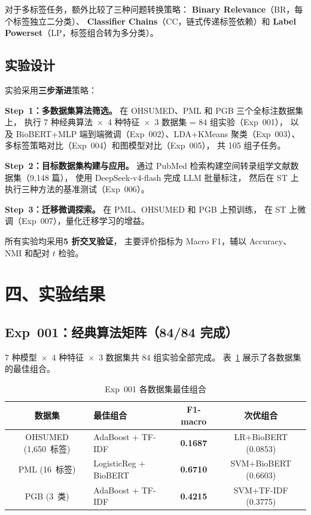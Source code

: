 \documentclass[12pt,a4paper]{ctexart}
\begin{document}
对于多标签任务，额外比较了三种问题转换策略：
\textbf{Binary Relevance}（BR，每个标签独立二分类）、
\textbf{Classifier Chains}（CC，链式传递标签依赖）和
\textbf{Label Powerset}（LP，标签组合转为多分类）。

\subsection{实验设计}

实验采用\textbf{三步渐进}策略：

\textbf{Step~1：多数据集算法筛选。}
在 OHSUMED、PML 和 PGB 三个全标注数据集上，
执行 7 种经典算法~$\times$~4 种特征~$\times$~3 数据集 = 84 组实验（Exp~001），
以及 BioBERT+MLP 端到端微调（Exp~002）、LDA+KMeans 聚类（Exp~003）、
多标签策略对比（Exp~004）和图模型对比（Exp~005），
共 105 组子任务。

\textbf{Step~2：目标数据集构建与应用。}
通过 PubMed 检索构建空间转录组学文献数据集（9,148 篇），
使用 DeepSeek-v4-flash 完成 LLM 批量标注，
然后在 ST 上执行三种方法的基准测试（Exp~006）。

\textbf{Step~3：迁移微调探索。}
在 PML、OHSUMED 和 PGB 上预训练，
在 ST 上微调（Exp~007），量化迁移学习的增益。

所有实验均采用\textbf{5 折交叉验证}，
主要评价指标为 Macro F1，辅以 Accuracy、NMI 和配对 $t$ 检验。

\section{四、实验结果}

\subsection{Exp~001：经典算法矩阵（84/84 完成）}

7 种模型~$\times$~4 种特征~$\times$~3 数据集共 84 组实验全部完成。
表~\ref{tab:exp001} 展示了各数据集的最佳组合。

\begin{table}[htbp]
\centering
\caption{Exp~001 各数据集最佳组合}
\label{tab:exp001}
\small
\begin{tabular}{clcc}
\toprule
\textbf{数据集} & \textbf{最佳组合} & \textbf{F1-macro} & \textbf{次优组合} \\
\midrule
OHSUMED (1,650~标签) & AdaBoost + TF-IDF & \textbf{0.1687} & LR+BioBERT (0.0853) \\
PML (16~标签)        & LogisticReg + BioBERT & \textbf{0.6710} & SVM+BioBERT (0.6603) \\
PGB (3~类)           & AdaBoost + TF-IDF & \textbf{0.4215} & SVM+TF-IDF (0.3775) \\
\bottomrule
\end{tabular}
\end{table}
\end{document}
